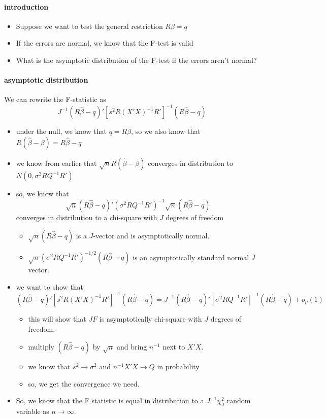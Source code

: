 \paragraph{introduction}
\begin{itemize}
\item Suppose we want to test the general restriction $R\beta = q$
\item If the errors are normal, we know that the F-test is valid
\item What is the asymptotic distribution of the F-test if the
         errors aren't normal?
\end{itemize}

\paragraph{asymptotic distribution}
       We can rewrite the F-statistic as
       \[ J^{-1} (R\hat\beta - q)'[s^2 R(X'X)^{-1}R']^{-1}(R\hat\beta -
       q) \]
\begin{itemize}
\item under the null, we know that $q = R\beta$, so we also know
         that $R(\hat\beta - \beta) = R\hat\beta - q$
\item we know from earlier that $\sqrt{n} R(\hat\beta - \beta)$
         converges in distribution to $N(0, \sigma^2 R Q^{-1} R')$
\item so, we know that \[\sqrt{n} (R\hat\beta - q)' (\sigma^2 R
         Q^{-1} R')^{-1} \sqrt{n} (R\hat\beta - q) \] converges in
         distribution to a chi-square with $J$ degrees of freedom
\begin{itemize}
\item $\sqrt{n}(R\hat\beta - q)$ is a $J$-vector and is asymptotically
           normal.
\item $\sqrt{n}(\sigma^2 R Q^{-1} R')^{-1/2} (R\hat\beta - q)$ is
           an asymptotically standard normal $J$ vector.
\end{itemize}
\item we want to show that \[ (R\hat\beta - q)'[s^2
         R(X'X)^{-1}R']^{-1}(R\hat\beta - q) = J^{-1} (R\hat\beta -
         q)'[\sigma^2 RQ^{-1}R']^{-1}(R\hat\beta - q) + o_p(1)\]
\begin{itemize}
\item this will show that $J F$ is asymptotically chi-square with
           $J$ degrees of freedom.
\item multiply $(R\hat\beta - q)$ by $\sqrt{n}$ and bring $n^{-1}$
           next to $X'X$.
\item we know that $s^2 \to \sigma^2$ and $n^{-1} X'X \to Q$ in probability
\item so, we get the convergence we need.
\end{itemize}
\item So, we know that the F statistic is equal in distribution
         to a $J^{-1} \chi_J^2$ random variable as $n \to \infty$.
\end{itemize}

